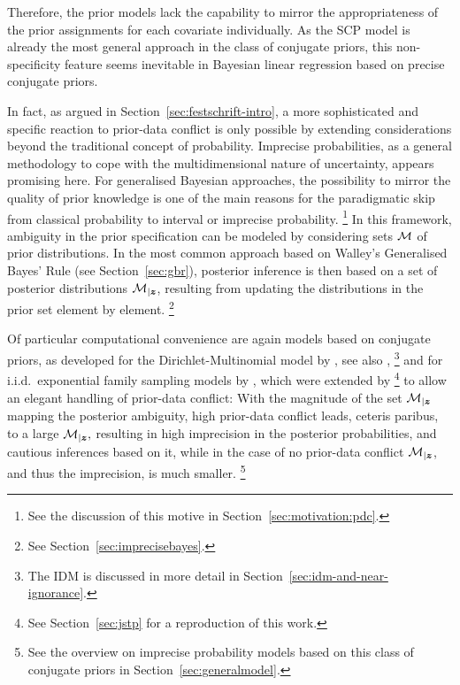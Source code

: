 Therefore, the prior models lack the capability to %
mirror the appropriateness of the prior assignments for each covariate individually.
As the SCP model is already the most general approach in the class of conjugate priors,
this non-specificity feature seems inevitable in Bayesian linear regression based on precise conjugate priors.


In fact, as argued in Section~\ref{sec:festschrift-intro}, a more sophisticated and specific reaction to prior-data conflict
is only possible by extending considerations beyond the traditional concept of probability.
Imprecise probabilities, as a general methodology to cope with the multidimensional nature of uncertainty, appears promising here.
For generalised Bayesian approaches, the possibility to mirror the quality of prior knowledge
is one of the main reasons for the paradigmatic skip from classical probability to interval or imprecise probability.%
\footnote{See the discussion of this motive in Section~\ref{sec:motivation:pdc}.}
In this framework, ambiguity in the prior specification
can be modeled by considering sets ${\cal M}$ of prior distributions.
In the most common approach based on Walley's \parencite*{1991:walley} Generalised Bayes' Rule (see Section~\ref{sec:gbr}),
posterior inference is then based on a set of posterior distributions ${\cal M}_{\vert {\bm z}}$,
resulting from updating the distributions in the prior set element by element.%
\footnote{See Section~\ref{sec:imprecisebayes}.}

Of particular computational convenience are again models based on conjugate priors, as developed
for the Dirichlet-Multinomial model by \textcite{1996:walley::idm}, see also \textcite{2009:bernard},%
\footnote{The IDM is discussed in more detail in Section~\ref{sec:idm-and-near-ignorance}.}
and for i.i.d.\ exponential family sampling models by \textcite{2005:quaeghebeurcooman},
which were extended by \textcite{Walter2009a}%
\footnote{See Section~\ref{sec:jstp} for a reproduction of this work.}
to allow an elegant handling of prior-data conflict:
With the magnitude of the set ${\cal M}_{\vert {\bm z}}$ mapping the posterior ambiguity,
high prior-data conflict leads, ceteris paribus, to a large
${\cal M}_{\vert {\bm z}},$ resulting in high imprecision in the
posterior probabilities, and cautious inferences based on it, while in the case of no prior-data conflict
${\cal M}_{\vert {\bm z}}$, and thus the imprecision, is much smaller.%
\footnote{See the overview on imprecise probability models based on this class of conjugate priors in Section~\ref{sec:generalmodel}.}

